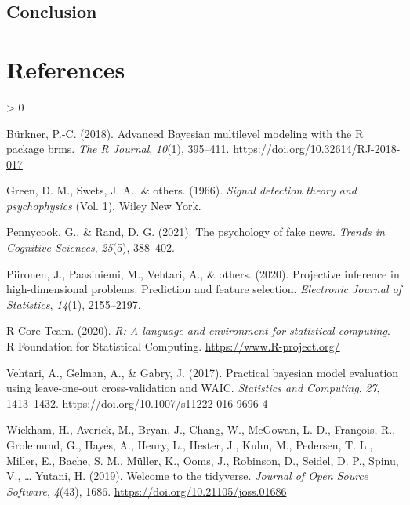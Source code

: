 \documentclass[
  english,
  man,floatsintext]{apa6}
\newlength{\cslhangindent}
\newenvironment{CSLReferences}[2] %
 {%
  \setlength{\parindent}{0pt}
  \ifodd #1 \everypar{\setlength{\hangindent}{\cslhangindent}}\ignorespaces\fi
  \ifnum #2 > 0
  \setlength{\parskip}{#2\baselineskip}
  \fi
 }%
 {}
\begin{document}
\hypertarget{conclusion}{%
\subsection{Conclusion}\label{conclusion}}

\newpage

\hypertarget{references}{%
\section{References}\label{references}}

\setlength{\parindent}{-0.5in}
\setlength{\leftskip}{0.5in}

\setlength{\parindent}{-0.5in}
\setlength{\leftskip}{0.5in}
\setlength{\parskip}{8pt}

\hypertarget{refs}{}
\begin{CSLReferences}{1}{0}
\leavevmode\hypertarget{ref-R-brms_b}{}%
Bürkner, P.-C. (2018). Advanced {Bayesian} multilevel modeling with the {R} package {brms}. \emph{The R Journal}, \emph{10}(1), 395--411. \url{https://doi.org/10.32614/RJ-2018-017}

\leavevmode\hypertarget{ref-green1966signal}{}%
Green, D. M., Swets, J. A., \& others. (1966). \emph{Signal detection theory and psychophysics} (Vol. 1). Wiley New York.

\leavevmode\hypertarget{ref-pennycook2021psychology}{}%
Pennycook, G., \& Rand, D. G. (2021). The psychology of fake news. \emph{Trends in Cognitive Sciences}, \emph{25}(5), 388--402.

\leavevmode\hypertarget{ref-piironen2020projective}{}%
Piironen, J., Paasiniemi, M., Vehtari, A., \& others. (2020). Projective inference in high-dimensional problems: Prediction and feature selection. \emph{Electronic Journal of Statistics}, \emph{14}(1), 2155--2197.

\leavevmode\hypertarget{ref-R-base}{}%
R Core Team. (2020). \emph{R: A language and environment for statistical computing}. R Foundation for Statistical Computing. \url{https://www.R-project.org/}

\leavevmode\hypertarget{ref-loo_2017}{}%
Vehtari, A., Gelman, A., \& Gabry, J. (2017). Practical bayesian model evaluation using leave-one-out cross-validation and WAIC. \emph{Statistics and Computing}, \emph{27}, 1413--1432. \url{https://doi.org/10.1007/s11222-016-9696-4}

\leavevmode\hypertarget{ref-R-tidyverse}{}%
Wickham, H., Averick, M., Bryan, J., Chang, W., McGowan, L. D., François, R., Grolemund, G., Hayes, A., Henry, L., Hester, J., Kuhn, M., Pedersen, T. L., Miller, E., Bache, S. M., Müller, K., Ooms, J., Robinson, D., Seidel, D. P., Spinu, V., \ldots{} Yutani, H. (2019). Welcome to the {tidyverse}. \emph{Journal of Open Source Software}, \emph{4}(43), 1686. \url{https://doi.org/10.21105/joss.01686}

\end{CSLReferences}
\end{document}
